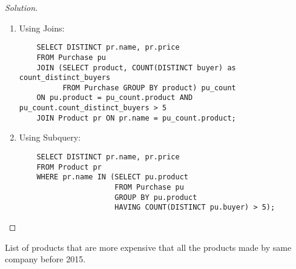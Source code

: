 \documentclass[10pt]{article}
\newenvironment{problem}[2][Problem]{\begin{trivlist}
\item[\hskip \labelsep {\bfseries #1}\hskip \labelsep {\bfseries #2.}]}{\end{trivlist}}
\begin{document}
\begin{proof}[Solution]
\begin{enumerate}
    \item Using Joins:
    \begin{verbatim}
    SELECT DISTINCT pr.name, pr.price
    FROM Purchase pu
    JOIN (SELECT product, COUNT(DISTINCT buyer) as count_distinct_buyers
          FROM Purchase GROUP BY product) pu_count
    ON pu.product = pu_count.product AND pu_count.count_distinct_buyers > 5
    JOIN Product pr ON pr.name = pu_count.product;
    \end{verbatim}
    
    \item Using Subquery:
    \begin{verbatim}
    SELECT DISTINCT pr.name, pr.price
    FROM Product pr
    WHERE pr.name IN (SELECT pu.product
                      FROM Purchase pu
                      GROUP BY pu.product
                      HAVING COUNT(DISTINCT pu.buyer) > 5);
    \end{verbatim}
\end{enumerate}
\end{proof}


\begin{problem}{8}
List of products that are more expensive that all the products made by same company before 2015.
\end{problem}
\end{document}

